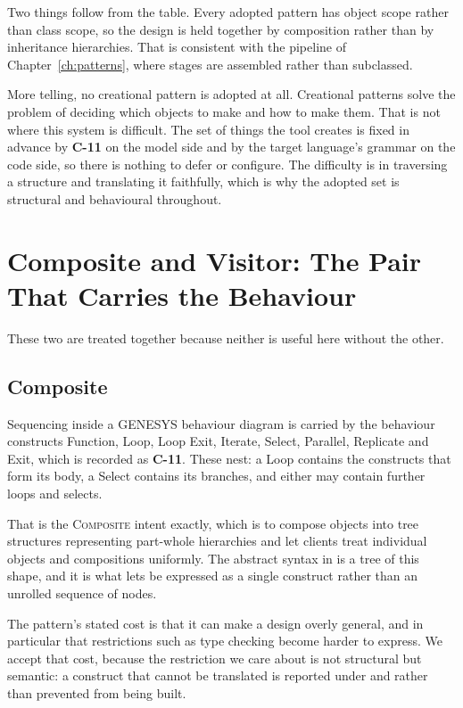 Two things follow from the table. Every adopted pattern has object scope rather
than class scope, so the design is held together by composition rather than by
inheritance hierarchies. That is consistent with the pipeline of
Chapter~\ref{ch:patterns}, where stages are assembled rather than subclassed.

More telling, no creational pattern is adopted at all. Creational patterns solve
the problem of deciding which objects to make and how to make them. That is not
where this system is difficult. The set of things the tool creates is fixed in
advance by \textbf{C-11} on the model side and by the target language's grammar
on the code side, so there is nothing to defer or configure. The difficulty is
in traversing a structure and translating it faithfully, which is why the
adopted set is structural and behavioural throughout.

\section{Composite and Visitor: The Pair That Carries the Behaviour}
\label{sec:composite-visitor}

These two are treated together because neither is useful here without the other.

\subsection{Composite}

Sequencing inside a GENESYS behaviour diagram is carried by the behaviour
constructs Function, Loop, Loop Exit, Iterate, Select, Parallel, Replicate and
Exit, which is recorded as \textbf{C-11}. These nest: a Loop contains the
constructs that form its body, a Select contains its branches, and either may
contain further loops and selects.

That is the \textsc{Composite} intent exactly, which is to compose objects into
tree structures representing part-whole hierarchies and let clients treat
individual objects and compositions uniformly. The abstract syntax in
 is a tree of this shape, and it is what lets
 be expressed as a single construct rather than an unrolled sequence
of nodes.

The pattern's stated cost is that it can make a design overly general, and in
particular that restrictions such as type checking become harder to express. We
accept that cost, because the restriction we care about is not structural but
semantic: a construct that cannot be translated is reported under  and
 rather than prevented from being built.

